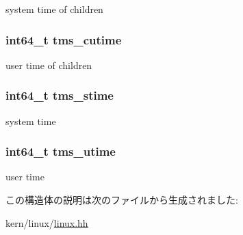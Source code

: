 system time of children \hypertarget{structLinux_1_1tms_a6da7d6e7d686aa5a9bf91b8bf6c4139f}{
\subsubsection[{tms\_\-cutime}]{\setlength{\rightskip}{0pt plus 5cm}int64\_\-t {\bf tms\_\-cutime}}}
\label{structLinux_1_1tms_a6da7d6e7d686aa5a9bf91b8bf6c4139f}


user time of children \hypertarget{structLinux_1_1tms_a35539e36d7debbc4664f2470764bbad0}{
\subsubsection[{tms\_\-stime}]{\setlength{\rightskip}{0pt plus 5cm}int64\_\-t {\bf tms\_\-stime}}}
\label{structLinux_1_1tms_a35539e36d7debbc4664f2470764bbad0}


system time \hypertarget{structLinux_1_1tms_ab04ac3ffd1b9aab37d4a7857e0ffcdb8}{
\subsubsection[{tms\_\-utime}]{\setlength{\rightskip}{0pt plus 5cm}int64\_\-t {\bf tms\_\-utime}}}
\label{structLinux_1_1tms_ab04ac3ffd1b9aab37d4a7857e0ffcdb8}


user time 

この構造体の説明は次のファイルから生成されました:\begin{DoxyCompactItemize}
\item 
kern/linux/\hyperlink{kern_2linux_2linux_8hh}{linux.hh}\end{DoxyCompactItemize}
